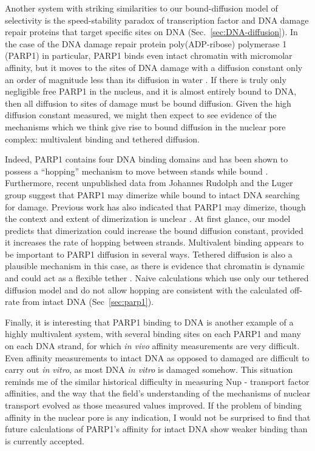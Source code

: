 Another system with striking similarities to our bound-diffusion model of selectivity is the speed-stability paradox of transcription factor and DNA damage repair proteins that target specific sites on DNA (Sec.~\ref{sec:DNA-diffusion}).  In the case of the DNA damage repair protein poly(ADP-ribose) polymerase 1 (PARP1) in particular, PARP1 binds even intact chromatin with micromolar affinity, but it moves to the sites of DNA damage with a diffusion constant only an order of magnitude less than its diffusion in water \cite{rudolph18,mahadevan18}.  If there is truly only negligible free PARP1 in the nucleus, and it is almost entirely bound to DNA, then all diffusion to sites of damage must be bound diffusion.  Given the high diffusion constant measured, we might then expect to see evidence of the mechanisms which we think give rise to bound diffusion in the nuclear pore complex: multivalent binding and tethered diffusion.  

Indeed, PARP1 contains four DNA binding domains and has been shown to possess a ``hopping'' mechanism to move between stands while bound \cite{rudolph18}.  Furthermore, recent unpublished data from Johannes Rudolph and the Luger group suggest that PARP1 may dimerize while bound to intact DNA searching for damage.  Previous work has also indicated that PARP1 may dimerize, though the context and extent of dimerization is unclear \cite{pion05,altmeyer09}.  At first glance, our model predicts that dimerization could increase the bound diffusion constant, provided it increases the rate of hopping between strands.  Multivalent binding appears to be important to PARP1 diffusion in several ways.  Tethered diffusion is also a plausible mechanism in this case, as there is evidence that chromatin is dynamic and could act as a flexible tether \cite{nozaki17,maeshima16}.  Naive calculations which use only our  tethered diffusion model and do not allow hopping are consistent with the calculated off-rate from intact DNA (Sec~\ref{sec:parp1}).  

Finally, it is interesting that PARP1 binding to DNA is another example of a highly multivalent system, with several binding sites on each PARP1 and many on each DNA strand, for which \textit{in vivo} affinity measurements are very difficult.  Even affinity measurements to intact DNA as opposed to damaged are difficult to carry out \textit{in vitro}, as most DNA \textit{in vitro} is damaged somehow.  This situation reminds me of the similar historical difficulty in measuring Nup - transport factor affinities, and the way that the field's understanding of the mechanisms of nuclear transport evolved as those measured values improved.   If the problem of binding affinity in the nuclear pore is any indication, I would not be surprised to find that future calculations of PARP1's affinity for intact DNA show weaker binding than is currently accepted. 

